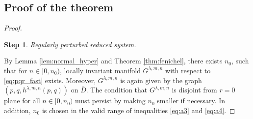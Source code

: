 \documentclass[a4paper,11pt]{article}
\newcounter{dummy}
\newtheorem{step}{Step}[dummy]
\numberwithin{step}{dummy}
\begin{document}

\subsection{Proof of the theorem} \label{sec:proof_proof} \break

\smallskip
\noindent
\begin{proof}
\begin{step}
 Regularly perturbed reduced system.
\end{step}
By Lemma \ref{lem:normal_hyper} and Theorem \ref{thm:fenichel}, there exists $n_0$, such that for $n \in [0, n_0)$, locally invariant manifold $G^{\lambda,m,n}$ with respect to \eqref{eq:pqr_fast} exists. Moreover,   $G^{\lambda,m,n}$ is again given by the graph $(p,q,h^{\lambda,m,n}(p,q))$ on $\bar{D}$. The condition that $G^{\lambda,m,n}$ is disjoint from $r=0$ plane for all $n \in [0, n_0)$ must persist by making $n_0$ smaller if necessary. In addition, $n_0$ is chosen in the valid range of inequalities \eqref{eq:a3} and \eqref{eq:a4}.%


\end{proof}
\end{document}
